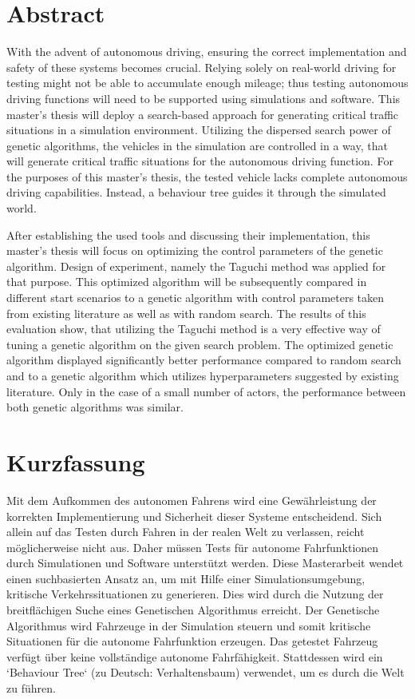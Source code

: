 \chapter*{Abstract}
\label{chap:abstract}
With the advent of autonomous driving, ensuring the correct implementation and safety of these systems becomes crucial. Relying solely on real-world driving for testing might not be able to accumulate enough mileage; thus testing autonomous driving functions will need to be supported using simulations and software. This master's thesis will deploy a search-based approach for generating critical traffic situations in a simulation environment. Utilizing the dispersed search power of genetic algorithms, the vehicles in the simulation are controlled in a way, that will generate critical traffic situations for the autonomous driving function. For the purposes of this master's thesis, the tested vehicle lacks complete autonomous driving capabilities. Instead, a behaviour tree guides it through the simulated world.

After establishing the used tools and discussing their implementation, this master's thesis will focus on optimizing the control parameters of the genetic algorithm. Design of experiment, namely the Taguchi method was applied for that purpose. This optimized algorithm will be subsequently compared in different start scenarios to a genetic algorithm with control parameters taken from existing literature as well as with random search. The results of this evaluation show, that utilizing the Taguchi method is a very effective way of tuning a genetic algorithm on the given search problem. The optimized genetic algorithm displayed significantly better performance compared to random search and to a genetic algorithm which utilizes hyperparameters suggested by existing literature. Only in the case of a small number of actors, the performance between both genetic algorithms was similar.


\chapter*{Kurzfassung}
\label{chap:kurzfassung}
Mit dem Aufkommen des autonomen Fahrens wird eine Gewährleistung der korrekten Implementierung und Sicherheit dieser Systeme entscheidend. Sich allein auf das Testen durch Fahren in der realen Welt zu verlassen, reicht möglicherweise nicht aus. Daher müssen Tests für autonome Fahrfunktionen durch Simulationen und Software unterstützt werden. Diese Masterarbeit wendet einen suchbasierten Ansatz an, um mit Hilfe einer Simulationsumgebung, kritische Verkehrssituationen zu generieren. Dies wird durch die Nutzung der breitflächigen Suche eines Genetischen Algorithmus erreicht. Der Genetische Algorithmus wird Fahrzeuge in der Simulation steuern und somit kritische Situationen für die autonome Fahrfunktion erzeugen. Das getestet Fahrzeug verfügt über keine vollständige autonome Fahrfähigkeit. Stattdessen wird ein ‘Behaviour Tree‘ (zu Deutsch: Verhaltensbaum) verwendet, um es durch die Welt zu führen.

